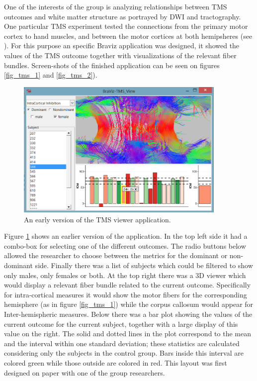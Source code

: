 

One of the interests of the group is analyzing relationships between TMS outcomes and white matter structure as portrayed by DWI and tractography. One particular TMS experiment tested the connections from the primary motor cortex to hand muscles, and between the motor cortices at both hemipsheres (see \autocite{schneider_cerebral_2012}). For this purpose an specific Braviz application was designed, it showed the values of the TMS outcome together with visualizations of the relevant fiber bundles. Screen-shots of the finished application can be seen on figures \ref{fig_tms_1} and \ref{fig_tms_2}). 

\begin{figure}
	\centering
		\includegraphics[width=0.90\textwidth]{figures/analysis/tms_view_early}
	\caption{An early version of the TMS viewer application.}
	\label{fig_tms_view_early}
\end{figure}

Figure \ref{fig_tms_view_early} shows an earlier version of the application. In the top left side it had a combo-box for selecting one of the different outcomes. The radio buttons below allowed the researcher to choose between the metrics for the dominant or non-dominant side. Finally there was a list of subjects which could be filtered to show only males, only females or both. At the top right there was a 3D viewer which would display a relevant fiber bundle related to the current outcome. Specifically for intra-cortical measures it would show the motor fibers for the corresponding hemisphere (as in figure \ref{fig_tms_1}) while the corpus callosum would appear for Inter-hemispheric measures.
Below there was a bar plot showing the values of the current outcome for the current subject, together with a large display of this value on the right. The solid and dotted lines in the plot correspond to the mean and the interval within one standard deviation; these statistics are calculated considering only the subjects in the control group. Bars inside this interval are colored green while those outside are colored in red.
This layout was first designed on paper with one of the group researchers. 

